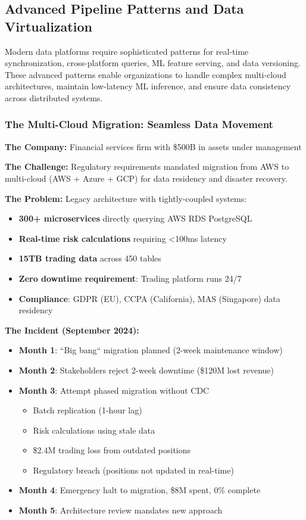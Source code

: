 \subsection{Advanced Pipeline Patterns and Data Virtualization}

Modern data platforms require sophisticated patterns for real-time synchronization, cross-platform queries, ML feature serving, and data versioning. These advanced patterns enable organizations to handle complex multi-cloud architectures, maintain low-latency ML inference, and ensure data consistency across distributed systems.

\subsubsection{The Multi-Cloud Migration: Seamless Data Movement}

\textbf{The Company:} Financial services firm with \$500B in assets under management

\textbf{The Challenge:} Regulatory requirements mandated migration from AWS to multi-cloud (AWS + Azure + GCP) for data residency and disaster recovery.

\textbf{The Problem:} Legacy architecture with tightly-coupled systems:

\begin{itemize}
    \item \textbf{300+ microservices} directly querying AWS RDS PostgreSQL
    \item \textbf{Real-time risk calculations} requiring <100ms latency
    \item \textbf{15TB trading data} across 450 tables
    \item \textbf{Zero downtime requirement}: Trading platform runs 24/7
    \item \textbf{Compliance}: GDPR (EU), CCPA (California), MAS (Singapore) data residency
\end{itemize}

\textbf{The Incident (September 2024):}

\begin{itemize}
    \item \textbf{Month 1}: ``Big bang`` migration planned (2-week maintenance window)
    \item \textbf{Month 2}: Stakeholders reject 2-week downtime (\$120M lost revenue)
    \item \textbf{Month 3}: Attempt phased migration without CDC
    \begin{itemize}
        \item Batch replication (1-hour lag)
        \item Risk calculations using stale data
        \item \$2.4M trading loss from outdated positions
        \item Regulatory breach (positions not updated in real-time)
    \end{itemize}
    \item \textbf{Month 4}: Emergency halt to migration, \$8M spent, 0\% complete
    \item \textbf{Month 5}: Architecture review mandates new approach
\end{itemize}

